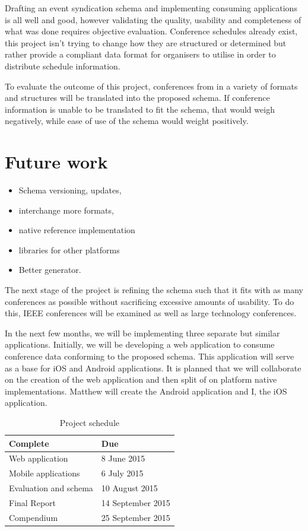 \documentclass{article}
\begin{document}
Drafting an event syndication schema and implementing consuming applications is all well and good, however validating the quality, usability and completeness of what was done requires objective evaluation. Conference schedules already exist, this project isn't trying to change how they are structured or determined but rather provide a compliant data format for organisers to utilise in order to distribute schedule information.

To evaluate the outcome of this project, conferences from in a variety of formats and structures will be translated into the proposed schema. If conference information is unable to be translated to fit the schema, that would weigh negatively, while ease of use of the schema would weight positively.

\section{Future work}
\begin{itemize}
\item Schema versioning, updates, 
\item interchange more formats,
\item native reference implementation
\item libraries for other platforms
\item Better generator.
\end{itemize}
The next stage of the project is refining the schema such that it fits with as many conferences as possible without sacrificing excessive amounts of usability. To do this, IEEE conferences will be examined as well as large technology conferences.

In the next few months, we will be implementing three separate but similar applications. Initially, we will be developing a web application to consume conference data conforming to the proposed schema. This application will serve as a base for iOS and Android applications. It is planned that we will collaborate on the creation of the web application and then split of on platform native implementations. Matthew will create the Android application and I, the iOS application.

\begin{table}[h]
\begin{tabular}{ll}
\hline
Complete              & Due               \\ \hline
Web application       & 8 June 2015       \\
Mobile applications   & 6 July 2015       \\
Evaluation and schema & 10 August 2015    \\
Final Report          & 14 September 2015 \\
Compendium            & 25 September 2015
\end{tabular}
\caption{Project schedule}
\end{table}
\end{document}
